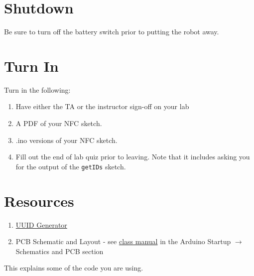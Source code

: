 \section{Shutdown}
Be sure to turn off the battery switch prior to putting the robot away.

\section{Turn In}
Turn in the following:
\begin{enumerate}
    \item Have either the TA or the instructor sign-off on your lab
    \item A PDF of your NFC sketch.
    \item .ino versions of your NFC sketch.
    \item Fill out the end of lab quiz prior to leaving. Note that it includes asking you 
            for the output of the \lstinline$getIDs$ sketch. 
\end{enumerate}

\section{Resources}\label{sec:wirelessresources}
\begin{enumerate}
    \item \href{https://www.uuidgenerator.net/}{UUID Generator} 
    \item PCB Schematic and Layout - see 
            \href{https://github.com/semcneil/Fundamentals-of-Microcontrollers-Manual}{class manual} 
            in the Arduino Startup $\rightarrow$ Schematics and PCB section
\end{enumerate}
This explains some of the code you are using.
